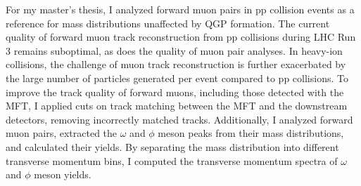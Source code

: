 For my master’s thesis, I analyzed forward muon pairs in pp collision events as a reference for mass distributions unaffected by QGP formation. The current quality of forward muon track reconstruction from pp collisions during LHC Run 3 remains suboptimal, as does the quality of muon pair analyses. In heavy-ion collisions, the challenge of muon track reconstruction is further exacerbated by the large number of particles generated per event compared to pp collisions. To improve the track quality of forward muons, including those detected with the MFT, I applied cuts on track matching between the MFT and the downstream detectors, removing incorrectly matched tracks. Additionally, I analyzed forward muon pairs, extracted the $\omega$ and $\phi$ meson peaks from their mass distributions, and calculated their yields. By separating the mass distribution into different transverse momentum bins, I computed the transverse momentum spectra of  $\omega$ and $\phi$ meson yields.
